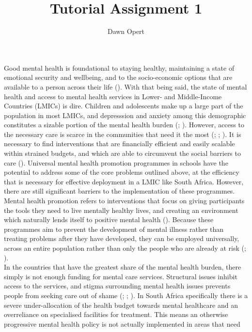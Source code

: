 \documentclass[stu,a4paper,12pt]{apa7}
\title{Tutorial Assignment 1}
\author{Dawn Opert}
\affiliation{OPRNET001}
\begin{document}
\maketitle
Good mental health is foundational to staying healthy, maintaining a state of
emotional security and wellbeing, and to the socio-economic options that are
available to a person across their life (\cite{barryetal13}). With that being
said, the state of mental health and access to mental health services in Lower-
and Middle-Income Countries (LMICs) is dire. Children and adolescents make up
a large part of the population in most LMICs, and depresssion and anxiety among
this demographic constitutes a sizable portion of the mental health burden
(\cite{barryetal13}; \cite{Oseral21}). However, access to the necessary care is
scarce in the communities that need it the most (\cite{Osetal20b};
\cite{Osetal20}; \cite{Oseral21}). It is necessary to find interventions that
are financially efficient and easily scalable within strained budgets, and
which are able to circumvent the social barriers to care (\cite{Osetal20b}).
Universal mental health promotion programmes in schools have the potential to
address some of the core problems outlined above, at the efficiency that is
necessary for effective deployment in a LMIC like South Africa. However, there
are still significant barriers to the implementation of these programmes. \\
Mental health promotion refers to interventions that focus on giving
participants the tools they need to live mentally healthy lives, and creating
an environment which naturally lends itself to positive mental health
(\cite{oretal18}). Because these programmes aim to prevent the development of
mental illness rather than treating problems after they have developed, they
can be employed universally, across an entire population rather than
only the people who are already at risk (\cite{Osetal20}; \cite{riduvetal11}). \\
In the countries that have the greatest share of the mental health burden,
there simply is not enough funding for mental care services. Structural issues
inhibit access to the services, and stigma surrounding mental health issues
prevents people from seeking care out of shame (\cite{barryetal13};
\cite{oretal18}; \cite{Osetal20b}). In South Africa specifically there is a
severe under-allocation of the health budget towards mental healthcare and an
overreliance on specialised facilities for treatment. This means an otherwise
progressive mental health policy is not actually implemented in areas that need
\end{document}
